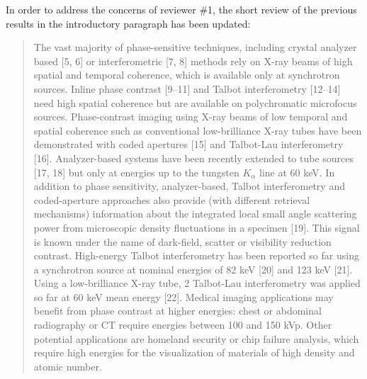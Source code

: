 \documentclass[a4paper,english]{scrartcl}
\begin{document}
In order to address the concerns of reviewer \#1, the short review of the
previous results in the
introductory paragraph has been updated:
\begin{quote}
The vast majority of phase-sensitive techniques, including crystal analyzer based [5, 6] or
interferometric [7, 8] methods rely on X-ray beams of high spatial and temporal coherence,
which is available only at synchrotron sources. Inline phase contrast [9–11] and Talbot interferometry [12–14] need high spatial coherence but are available on polychromatic microfocus
sources. Phase-contrast imaging using X-ray beams of low temporal and spatial coherence
such as conventional low-brilliance X-ray tubes have been demonstrated with coded apertures [15] and Talbot-Lau interferometry [16]. Analyzer-based systems have been recently
extended to tube sources [17, 18] but only at energies up to the tungsten
$K_\alpha$ line at 60 keV. In
addition to phase sensitivity, analyzer-based, Talbot interferometry and coded-aperture approaches also provide (with different retrieval mechanisms) information about the integrated
local small angle scattering power from microscopic density fluctuations in a specimen [19].
This signal is known under the name of dark-field, scatter or visibility reduction contrast.
High-energy Talbot interferometry has been reported so far using a synchrotron source
at nominal energies of 82 keV [20] and 123 keV [21]. Using a low-brilliance X-ray tube,
2
Talbot-Lau interferometry was applied so far at 60 keV mean energy [22]. Medical imaging
applications may benefit from phase contrast at higher energies: chest or abdominal radiography or CT require energies between 100 and 150 kVp. Other potential applications are
homeland security or chip failure analysis, which require high energies for the visualization
of materials of high density and atomic number.
\end{quote}
\end{document}
